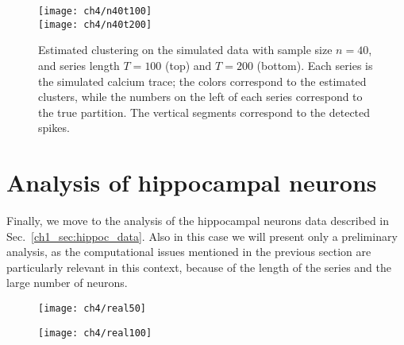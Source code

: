 \begin{figure}
	\centering
	\texttt{[image: ch4/n40t100]}\\
	\texttt{[image: ch4/n40t200]}
	\label{ch4:fig_n40}
	\caption[Estimated clustering on the simulated data with sample size $n=40$.]{Estimated clustering on the simulated data with sample size $n=40$, and series length $T=100$ (top) and $T=200$ (bottom). Each series is the simulated calcium trace; the colors correspond to the estimated clusters, while the numbers on the left of each series correspond to the true partition. The vertical segments correspond to the detected spikes.}
\end{figure}





\section{Analysis of hippocampal neurons}
Finally, we move to the analysis of the hippocampal neurons data described in Sec.~\ref{ch1_sec:hippoc_data}. 
Also in this case we will present only a preliminary analysis, as the computational issues mentioned in the previous section are particularly relevant in this context, because of the length of the series and the large number of neurons. 

\begin{figure}
	\centering
	\texttt{[image: ch4/real50]}\\
\end{figure}

\begin{figure}
	\centering
	\texttt{[image: ch4/real100]}\\
\end{figure}





























